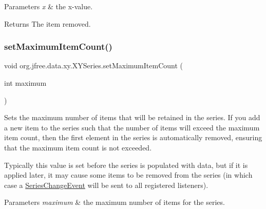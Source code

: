 \begin{DoxyParams}{Parameters}
{\em x} & the x-\/value.\\
\hline
\end{DoxyParams}
\begin{DoxyReturn}{Returns}
The item removed. 
\end{DoxyReturn}
\mbox{\label{classorg_1_1jfree_1_1data_1_1xy_1_1_x_y_series_a523412c86de56ff2f9dc800dc65a9b2c}} 
\subsubsection{\texorpdfstring{set\+Maximum\+Item\+Count()}{setMaximumItemCount()}}
{\footnotesize\ttfamily void org.\+jfree.\+data.\+xy.\+X\+Y\+Series.\+set\+Maximum\+Item\+Count (\begin{DoxyParamCaption}\item[{int}]{maximum }\end{DoxyParamCaption})}

Sets the maximum number of items that will be retained in the series. If you add a new item to the series such that the number of items will exceed the maximum item count, then the first element in the series is automatically removed, ensuring that the maximum item count is not exceeded. 

Typically this value is set before the series is populated with data, but if it is applied later, it may cause some items to be removed from the series (in which case a \mbox{\hyperlink{}{Series\+Change\+Event}} will be sent to all registered listeners).


\begin{DoxyParams}{Parameters}
{\em maximum} & the maximum number of items for the series. \\
\hline
\end{DoxyParams}
\mbox{\label{classorg_1_1jfree_1_1data_1_1xy_1_1_x_y_series_a1b5d7a37bf6d8ff6c6ec6689653b3589}} 
